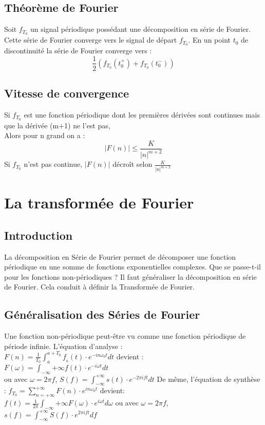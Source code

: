 \documentclass[10pt,a4paper,twoside]{article}
\begin{document}
\subsection{Théorème de Fourier}
Soit $f_{T_{0}}$ un signal périodique possédant une décomposition en série de Fourier. Cette série de Fourier converge vers le signal de départ $f_{T_{0}}$. En un point $t_{0}$ de discontinuité la série de Fourier converge vers :
$$\frac{1}{2}(f_{T_{0}}(t_{0}^{+})+f_{T_{0}}(t_{0}^{-}))$$

\subsection{Vitesse de convergence}
Si $f_{T_{0}}$ est une fonction périodique dont les premières dérivées sont continues mais que la dérivée (m+1) ne l'est pas,\\
Alors pour n grand on a :
$$|F(n)| \leq \frac{K}{|n|^{m+2}}$$
Si $f_{T_{0}}$ n'est pas continue, $|F(n)|$ décroît selon $\frac{K}{|n|^{m+2}}$

\section{La transformée de Fourier}
\subsection{Introduction}
La décomposition en Série de Fourier permet de décomposer une fonction périodique en une somme de fonctions exponentielles complexes. Que se passe-t-il pour les fonctions non-périodiques ? Il faut généraliser la décomposition en série de Fourier. Cela conduit à définir la Transformée de Fourier.

\subsection{Généralisation des Séries de Fourier}
Une fonction non-périodique peut-être vu comme une fonction périodique de période infinie. L'équation d'analyse :\\
$F(n) = \frac{1}{T_{0}} \int_{a}^{a+T_{0}}f_{_{0}}(t) \cdot e^{-in\omega_{0}t} dt$ devient :\\
$F(\omega) = \int_{-\infty}{+\infty} f(t)\cdot e^{-i\omega t}dt$\\
ou avec $\omega = 2\pi f$, $S(f)=\int_{-\infty}^{+\infty}s(t)\cdot e^{-2\pi ift} dt$
De même, l'équation de synthèse :
$f_{T_{0}}=\sum_{n=+\infty}^{+\infty} F(n)\cdot e^{in\omega_{0}t}$ devient:\\
$f(t)= \frac{1}{2\pi} \int_{-\infty}{+\infty}F(\omega) \cdot e^{i\omega t}d\omega$
ou avec $\omega = 2\pi f$, $s(f)=\int_{-\infty}^{+\infty}S(f) \cdot e^{2\pi ift} df$
\end{document}
